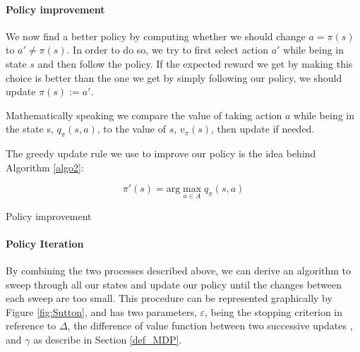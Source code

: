 \documentclass[14pt,a4paper]{article}
\theoremstyle{definition}
\begin{document}
\paragraph{Policy improvement}

We now find a better policy by computing whether we should change $a = \pi(s) $ to $ a'\neq\pi(s)$. In order to do so, we try to first select action $a'$ while being in state $s$ and then follow the policy. If the expected reward we get by making this choice is better than the one we get by simply following our policy, we should update $\pi(s):=a'$.

Mathematically speaking we compare the value of taking action $a$ while being in the state s, $q_{\pi}(s,a)$, to the value of $s$, $v_{\pi}(s)$, then update if needed.

The greedy update rule we use to improve our policy is the idea behind Algorithm \ref{algo2}: 

$$ 
\pi'(s)=\text{arg}\max_{a \in A}q_{\pi}(s,a)
$$

\begin{algorithm}

    
    \caption{Policy improvement}
    \label{algo2}

\end{algorithm}



\paragraph{Policy Iteration} By combining the two processes described above, we can derive an algorithm to sweep through all our states and update our policy until the changes between each sweep are too small. This procedure can be represented graphically by Figure \ref{fig:Sutton}, and has two parameters, $\varepsilon$, being the stopping criterion in reference to $\Delta$, the difference of value function between two successive updates , and $\gamma$ as describe in Section \ref{def_MDP}.
\end{document}

